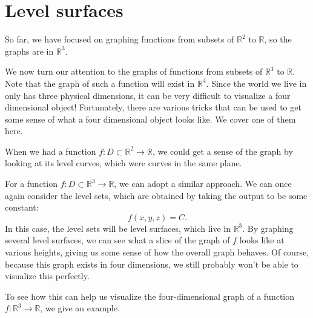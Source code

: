\documentclass{ximera}
\begin{document}
\section*{Level surfaces}

So far, we have focused on graphing functions from subsets of $\mathbb{R}^2$ to $\mathbb{R}$, so the graphs are in $\mathbb{R}^3$.

We now turn our attention to the graphs of functions from subsets of $\mathbb{R}^3$ to $\mathbb{R}$. Note that the graph of such a function will exist in $\mathbb{R}^4$. Since the world we live in only has three physical dimensions, it can be very difficult to visualize a four dimensional object! Fortunately, there are various tricks that can be used to get some sense of what a four dimensional object looks like. We cover one of them here.

When we had a function $f:D\subset\mathbb{R}^2\rightarrow\mathbb{R}$, we could get a sense of the graph by looking at its level curves, which were curves in the same plane.

For a function $f:D\subset\mathbb{R}^3\rightarrow\mathbb{R}$, we can adopt a similar approach. We can once again consider the level sets, which are obtained by taking the output to be some constant:
\[
f(x,y,z) = C.
\]
In this case, the level sets will be level surfaces, which live in $\mathbb{R}^3$. By graphing several level surfaces, we can see what a slice of the graph of $f$ looks like at various heights, giving us some sense of how the overall graph behaves. Of course, because this graph exists in four dimensions, we still probably won't be able to visualize this perfectly.

To see how this can help us visualize the four-dimensional graph of a function $f:\mathbb{R}^3\rightarrow\mathbb{R}$, we give an example.
\end{document}
